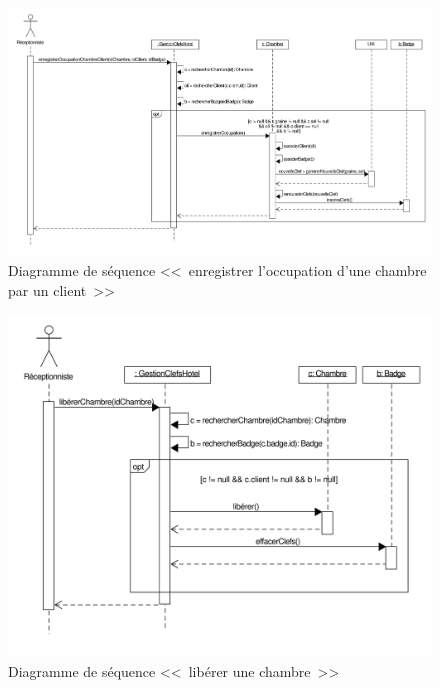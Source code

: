 \documentclass[11pt,article]{article}
\begin{document}
\begin{figure}[h!]
\begin{center}
\includegraphics[scale=0.3]{DiagrammesDeSequence/gestionclefshotel_uml_diag_seq_enregistrer_occupation_chambre_client}
\caption{Diagramme de séquence <<~enregistrer l'occupation d'une chambre par un client~>>}
\end{center}
\label{umlet_diag_classes}
\end{figure}

\begin{figure}[h!]
\begin{center}
\includegraphics[scale=0.5]{DiagrammesDeSequence/gestionclefshotel_uml_diag_seq_liberer_chambre}
\caption{Diagramme de séquence <<~libérer une chambre~>>}
\end{center}
\label{umlet_diag_classes}
\end{figure}
\end{document}
